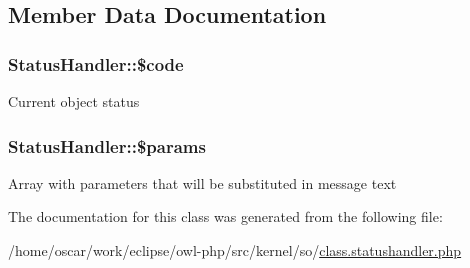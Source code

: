 \subsection{Member Data Documentation}
\hypertarget{classStatusHandler_b74e826d2401345eb20b11fe7d78aa45}{
\subsubsection{\setlength{\rightskip}{0pt plus 5cm}StatusHandler::\$code}}
\label{classStatusHandler_b74e826d2401345eb20b11fe7d78aa45}


Current object status \hypertarget{classStatusHandler_599f9c9284340399fdcb7dac9cb7856f}{
\subsubsection{\setlength{\rightskip}{0pt plus 5cm}StatusHandler::\$params}}
\label{classStatusHandler_599f9c9284340399fdcb7dac9cb7856f}


Array with parameters that will be substituted in message text 

The documentation for this class was generated from the following file:\begin{CompactItemize}
\item 
/home/oscar/work/eclipse/owl-php/src/kernel/so/\hyperlink{class_8statushandler_8php}{class.statushandler.php}\end{CompactItemize}
